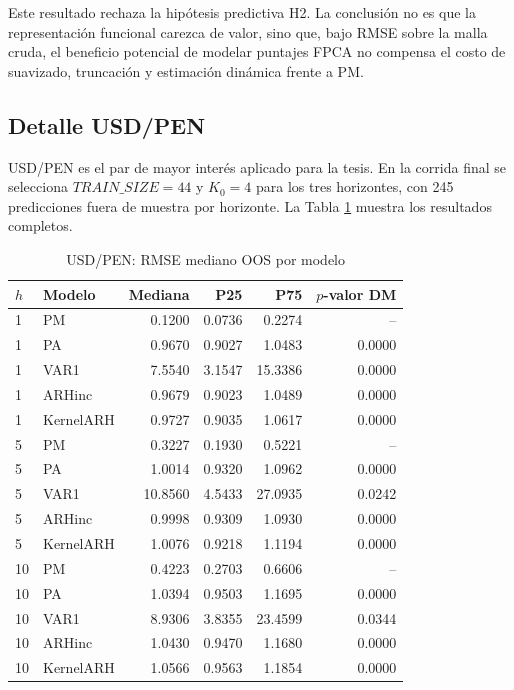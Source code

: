 \documentclass[12pt,a4paper]{article}
\begin{document}
Este resultado rechaza la hipótesis predictiva H2. La conclusión no es que la representación funcional carezca de valor, sino que, bajo RMSE sobre la malla cruda, el beneficio potencial de modelar puntajes FPCA no compensa el costo de suavizado, truncación y estimación dinámica frente a PM.

\subsection{Detalle USD/PEN}

USD/PEN es el par de mayor interés aplicado para la tesis. En la corrida final se selecciona \(TRAIN\_SIZE=44\) y \(K_0=4\) para los tres horizontes, con 245 predicciones fuera de muestra por horizonte. La Tabla \ref{tab:usdpen_rmse} muestra los resultados completos.

\begin{table}[H]
\centering
\caption{USD/PEN: RMSE mediano OOS por modelo}
\label{tab:usdpen_rmse}
\small
\begin{tabular}{llrrrr}
\toprule
\(h\) & Modelo & Mediana & P25 & P75 & \(p\)-valor DM \\
\midrule
1 & PM & 0.1200 & 0.0736 & 0.2274 & -- \\
1 & PA & 0.9670 & 0.9027 & 1.0483 & 0.0000 \\
1 & VAR1 & 7.5540 & 3.1547 & 15.3386 & 0.0000 \\
1 & ARHinc & 0.9679 & 0.9023 & 1.0489 & 0.0000 \\
1 & KernelARH & 0.9727 & 0.9035 & 1.0617 & 0.0000 \\
5 & PM & 0.3227 & 0.1930 & 0.5221 & -- \\
5 & PA & 1.0014 & 0.9320 & 1.0962 & 0.0000 \\
5 & VAR1 & 10.8560 & 4.5433 & 27.0935 & 0.0242 \\
5 & ARHinc & 0.9998 & 0.9309 & 1.0930 & 0.0000 \\
5 & KernelARH & 1.0076 & 0.9218 & 1.1194 & 0.0000 \\
10 & PM & 0.4223 & 0.2703 & 0.6606 & -- \\
10 & PA & 1.0394 & 0.9503 & 1.1695 & 0.0000 \\
10 & VAR1 & 8.9306 & 3.8355 & 23.4599 & 0.0344 \\
10 & ARHinc & 1.0430 & 0.9470 & 1.1680 & 0.0000 \\
10 & KernelARH & 1.0566 & 0.9563 & 1.1854 & 0.0000 \\
\bottomrule
\end{tabular}
\end{table}
\end{document}
